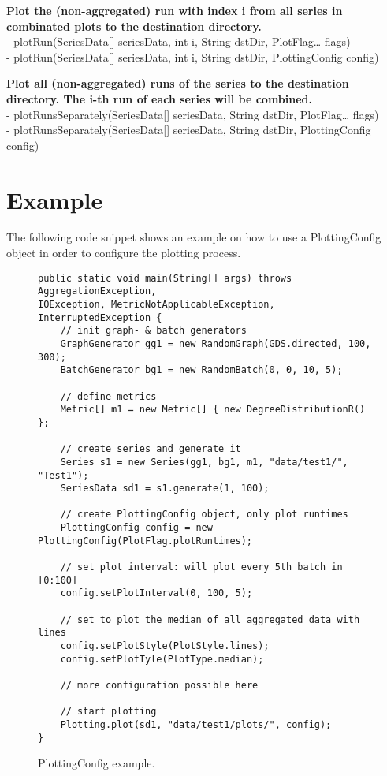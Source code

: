 \textbf{Plot the (non-aggregated) run with index i from all series in combinated plots to the destination directory.}\\
- plotRun(SeriesData[] seriesData, int i, String dstDir, PlotFlag… flags)\\
- plotRun(SeriesData[] seriesData, int i, String dstDir, PlottingConfig config)

\textbf{Plot all (non-aggregated) runs of the series to the destination directory. The i-th run of each series will be combined.}\\
- plotRunsSeparately(SeriesData[] seriesData, String dstDir, PlotFlag… flags)\\
- plotRunsSeparately(SeriesData[] seriesData, String dstDir, PlottingConfig config)

\section{Example}
The following code snippet shows an example on how to use a PlottingConfig object in order to configure the plotting process.

\begin{figure} [bh]
\begin{lstlisting}
public static void main(String[] args) throws AggregationException,
IOException, MetricNotApplicableException, InterruptedException {
	// init graph- & batch generators
	GraphGenerator gg1 = new RandomGraph(GDS.directed, 100, 300);
	BatchGenerator bg1 = new RandomBatch(0, 0, 10, 5);

	// define metrics
	Metric[] m1 = new Metric[] { new DegreeDistributionR() };

	// create series and generate it
	Series s1 = new Series(gg1, bg1, m1, "data/test1/", "Test1");
	SeriesData sd1 = s1.generate(1, 100);

	// create PlottingConfig object, only plot runtimes
	PlottingConfig config = new PlottingConfig(PlotFlag.plotRuntimes);

	// set plot interval: will plot every 5th batch in [0:100]
	config.setPlotInterval(0, 100, 5);
	
	// set to plot the median of all aggregated data with lines
	config.setPlotStyle(PlotStyle.lines);
	config.setPlotTyle(PlotType.median);
	
 	// more configuration possible here
 	
	// start plotting
	Plotting.plot(sd1, "data/test1/plots/", config);
}
\end{lstlisting}
\caption{PlottingConfig example.}
\label{code:example}
\end{figure}
